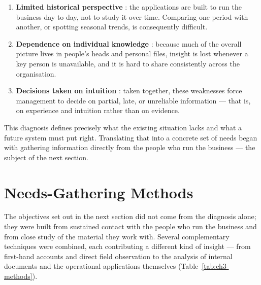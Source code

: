 \begin{enumerate}[label=\textbf{\arabic*.}]
    \item \textbf{Limited historical perspective} : the applications are built to run the business day
          to day, not to study it over time. Comparing one period with another, or spotting seasonal
          trends, is consequently difficult.
    \item \textbf{Dependence on individual knowledge} : because much of the overall picture lives in
          people's heads and personal files, insight is lost whenever a key person is unavailable, and
          it is hard to share consistently across the organisation.
    \item \textbf{Decisions taken on intuition} : taken together, these weaknesses force management to
          decide on partial, late, or unreliable information --- that is, on experience and intuition
          rather than on evidence.
\end{enumerate}

This diagnosis defines precisely what the existing situation lacks and what a future system must put
right. Translating that into a concrete set of needs began with gathering information directly from
the people who run the business --- the subject of the next section.


\section{Needs-Gathering Methods}
\label{sec:ch3-methods}

The objectives set out in the next section did not come from the diagnosis alone; they were built from
sustained contact with the people who run the business and from close study of the material they work
with. Several complementary techniques were combined, each contributing a different kind of insight ---
from first-hand accounts and direct field observation to the analysis of internal documents and the
operational applications themselves (Table~\ref{tab:ch3-methods}).

